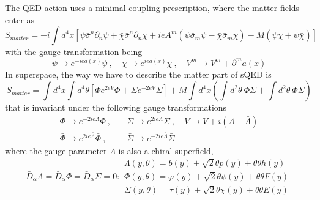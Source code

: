 \documentclass[a4paper,12pt]{article}
\numberwithin{equation}{section}
\numberwithin{exe}{section}
\newcommand{\p}{{\partial}}
\newcommand{\Db}{{\bar D}}
\newcommand{\ad}{{\dot\alpha}}
\renewcommand{\L}{{\Lambda}}
\newcommand{\Lb}{{\bar\Lambda}}
\renewcommand{\S}{{\Sigma}}
\newcommand{\Sb}{{\bar\Sigma}}
\renewcommand{\sb}{{\bar\sigma}}
\renewcommand{\t}{{\theta}}
\newcommand{\tb}{{\bar\theta}}
\newcommand{\vphi}{{\varphi}}
\newcommand{\chib}{{\bar\chi}}
\newcommand{\Phib}{{\bar \Phi}}
\newcommand{\psib}{{\bar\psi}}
\begin{document}
The QED action uses a minimal coupling prescription, where the matter fields enter as
	\begin{equation}
	S_{matter} = - i\int d^4 x\left[ \psib\sb^n\p_n\psi + \chib\sb^n\p_n\chi + ieA^m(\psib\sb_m\psi-\chib\sb_m\chi)-M(\psi\chi+\psib\chib)\right]
	\end{equation}
with the gauge transformation being
	\begin{equation}
	\psi\rightarrow e^{-iea(x)}\psi\ ,\quad\chi\rightarrow e^{iea(x)}\chi\ ,\quad V^m\rightarrow V^m + \p^m a(x)
	\end{equation}
In superspace, the way we have to describe the matter part of sQED is
	\begin{equation}
	S_{matter} = \int d^4 x\int d^4\t\left[\Phib e^{2eV}\Phi + \Sb e^{-2eV}\S \right] + M\int d^4 x\left(\int d^2\t\ \Phi\S + \int d^2\tb\ \Phib\Sb \right)
	\end{equation}
that is invariant under the following gauge transformations
	\begin{equation}
		\begin{aligned}
		\Phi\rightarrow e^{-2ie\L}\Phi\ ,&\quad\S\rightarrow e^{2ie\L}\S\ ,\quad V\rightarrow V+i(\L-\Lb) \\
		\Phib\rightarrow e^{2ie\Lb}\Phib\ ,& \quad\Sb\rightarrow e^{-2ie\Lb}\Sb
		\end{aligned}
	\end{equation}
where the gauge parameter $\L$ is also a chiral superfield,
	\begin{equation}
	\Db_\ad\L = \Db_\ad \Phi =\Db_\ad\S = 0 :
		\begin{array}{l}
		\L(y,\t) = b(y) + \sqrt2\t p(y) + \t\t h(y) \\
		\Phi(y,\t) = \vphi(y) + \sqrt2 \t\psi (y) + \t\t F(y) \\
		\S(y,\t) = \tau(y) + \sqrt2\t\chi(y) + \t\t E(y)
		\end{array}
	\end{equation}
\end{document}
